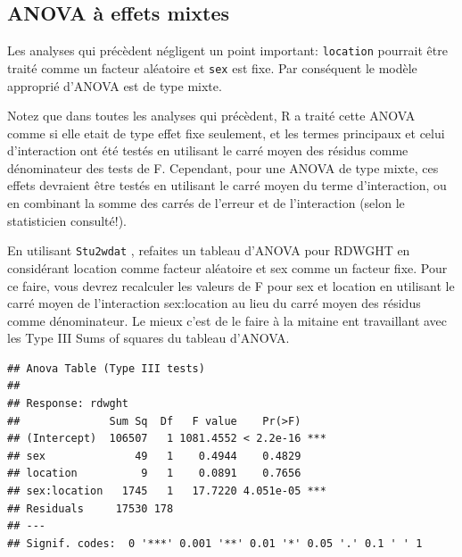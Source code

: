 \documentclass[12pt,]{book}
\newenvironment{Shaded}{\begin{snugshade}}{\end{snugshade}}
\newcommand{\DataTypeTok}[1]{\textcolor[rgb]{0.27,0.27,0.27}{#1}}
\newcommand{\DecValTok}[1]{\textcolor[rgb]{0.06,0.06,0.06}{#1}}
\newcommand{\KeywordTok}[1]{\textcolor[rgb]{0.27,0.27,0.27}{\textbf{#1}}}
\newcommand{\NormalTok}[1]{#1}
\begin{document}
\hypertarget{anova-uxe0-effets-mixtes}{%
\subsection{ANOVA à effets mixtes}\label{anova-uxe0-effets-mixtes}}

Les analyses qui précèdent négligent un point important: \texttt{location} pourrait être traité comme un facteur aléatoire et \texttt{sex} est fixe. Par conséquent le modèle approprié d'ANOVA est de type mixte.

Notez que dans toutes les analyses qui précèdent, R a traité cette ANOVA comme si elle etait de type effet fixe seulement, et les termes principaux et celui d'interaction ont été testés en utilisant le carré moyen des résidus comme dénominateur des tests de F. Cependant, pour une ANOVA de type mixte, ces effets devraient être testés en utilisant le carré moyen du terme d'interaction, ou en combinant la somme des carrés de l'erreur et de l'interaction (selon le statisticien consulté!).

En utilisant \texttt{Stu2wdat} , refaites un tableau d'ANOVA pour RDWGHT en considérant location comme facteur aléatoire et sex comme un facteur fixe. Pour ce faire, vous devrez recalculer les valeurs de F pour sex et location en utilisant le carré moyen de l'interaction sex:location au lieu du carré moyen des résidus comme dénominateur. Le mieux c'est de le faire à la mitaine ent travaillant avec les Type III Sums of squares du tableau d'ANOVA.

\begin{verbatim}
## Anova Table (Type III tests)
## 
## Response: rdwght
##              Sum Sq  Df   F value    Pr(>F)    
## (Intercept)  106507   1 1081.4552 < 2.2e-16 ***
## sex              49   1    0.4944    0.4829    
## location          9   1    0.0891    0.7656    
## sex:location   1745   1   17.7220 4.051e-05 ***
## Residuals     17530 178                        
## ---
## Signif. codes:  0 '***' 0.001 '**' 0.01 '*' 0.05 '.' 0.1 ' ' 1
\end{verbatim}
\end{document}
